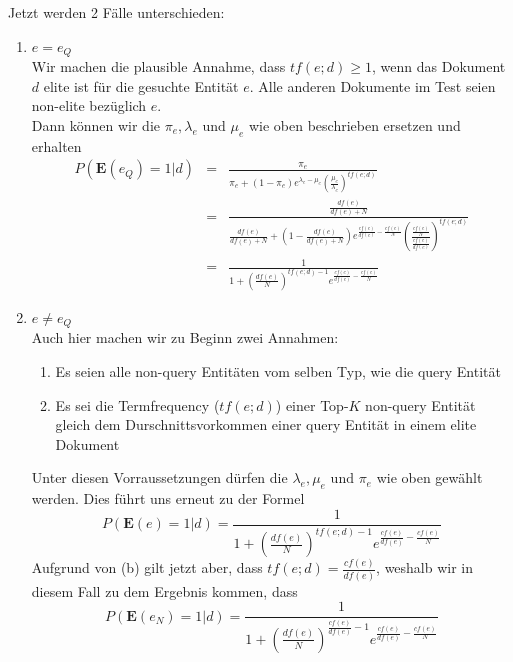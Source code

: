 Jetzt werden 2 Fälle unterschieden:
\begin{enumerate}
	\item $e=e_Q$ \\
		Wir machen die plausible Annahme, dass $tf(e;d) \geq 1$, wenn das Dokument $d$ elite ist für die gesuchte Entität $e$. Alle anderen Dokumente im Test seien non-elite bezüglich $e$. \\
		Dann können wir die $\pi_e, \lambda_e \text{ und } \mu_e$ wie oben beschrieben ersetzen und erhalten
		\begin{eqnarray*}
			P(\textbf{E}(e_Q)=1|d)	&=&	\frac{\pi_e}{\pi_e + (1-\pi_e)e^{\lambda_e - \mu_e}\left( \frac{\mu_e}{\lambda_e}\right)^{tf(e;d)}}\\
			&=&	\frac{\frac{df(e)}{df(e) + N}}{\frac{df(e)}{df(e) + N} + \left(1-\frac{df(e)}{df(e) + N}\right) e^{\frac{cf(e)}{df(e)}-\frac{cf(e)}{N}} \left( \frac{\frac{cf(e)}{N}}{\frac{cf(e)}{df(e)}}\right)^{tf(e;d)}}\\
			&=&	\frac{1}{1+ \left( \frac{df(e)}{N}\right)^{tf(e;d)-1}e^{\frac{cf(e)}{df(e)}-\frac{cf(e)}{N}}}
		\end{eqnarray*}

	\item $e \neq e_Q$ \\
		Auch hier machen wir zu Beginn zwei Annahmen:
		\begin{enumerate}
			\item Es seien alle non-query Entitäten vom selben Typ, wie die query Entität
			\item Es sei die Termfrequency ($tf(e;d)$) einer Top-$K$ non-query Entität gleich dem Durschnittsvorkommen einer query Entität in einem elite Dokument
		\end{enumerate}
		Unter diesen Vorraussetzungen dürfen die $\lambda_e, \mu_e \text{ und } \pi_e$ wie oben gewählt werden. Dies führt uns erneut zu der Formel
		\[ 	P(\textbf{E}(e)=1|d) = \frac{1}{1+ \left( \frac{df(e)}{N}\right)^{tf(e;d)-1}e^{\frac{cf(e)}{df(e)}-\frac{cf(e)}{N}}} \]
		Aufgrund von (b) gilt jetzt aber, dass $tf(e;d) = \frac{cf(e)}{df(e)}$, weshalb wir in diesem Fall zu dem Ergebnis kommen, dass
		\[	P(\textbf{E}(e_N)=1|d) = \frac{1}{1+ \left( \frac{df(e)}{N}\right)^{\frac{cf(e)}{df(e)}-1}e^{\frac{cf(e)}{df(e)}-\frac{cf(e)}{N}}} \]
\end{enumerate}

